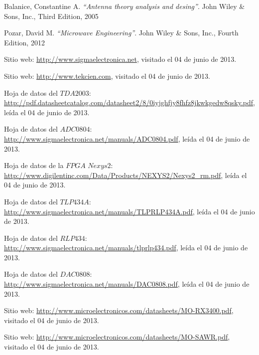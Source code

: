 \documentclass[10pt,graphicx,caption,rotating]{article}
\begin{document}

\begin{thebibliography}{99}

 Balanice, Constantine A.
{\em ``Antenna theory analysis and desing''}.
John Wiley \& Sons, Inc., Third Edition, 2005

 Pozar, David M.
{\em ``Microwave Engineering''}.
John Wiley \& Sons, Inc., Fourth Edition, 2012

 Sitio web: \url{http://www.sigmaelectronica.net}, visitado el 04 de junio de 2013.

 Sitio web: \url{http://www.tekcien.com}, visitado el 04 de junio de 2013.

 Hoja de datos del $TDA2003$: \url{http://pdf.datasheetcatalog.com/datasheet2/8/0iyjghfjy8fhfz8jkwkgedw8qsky.pdf}, leída el 04 de junio de 2013.

 Hoja de datos del $ADC0804$: \url{http://www.sigmaelectronica.net/manuals/ADC0804.pdf}, leída el 04 de junio de 2013.

 Hoja de datos de la $FPGA$ $Nexys2$: \url{http://www.digilentinc.com/Data/Products/NEXYS2/Nexys2_rm.pdf}, leída el 04 de junio de 2013.

 Hoja de datos del $TLP434A$: \url{http://www.sigmaelectronica.net/manuals/TLPRLP434A.pdf}, leída el 04 de junio de 2013.

 Hoja de datos del $RLP434$: \url{http://www.sigmaelectronica.net/manuals/tlprlp434.pdf}, leída el 04 de junio de 2013.

 Hoja de datos del $DAC0808$: \url{http://www.sigmaelectronica.net/manuals/DAC0808.pdf}, leída el 04 de junio de 2013.

 Sitio web: \url{http://www.microelectronicos.com/datasheets/MO-RX3400.pdf}, visitado el 04 de junio de 2013.

 Sitio web: \url{http://www.microelectronicos.com/datasheets/MO-SAWR.pdf}, visitado el 04 de junio de 2013.

\end{thebibliography}
\end{document}
